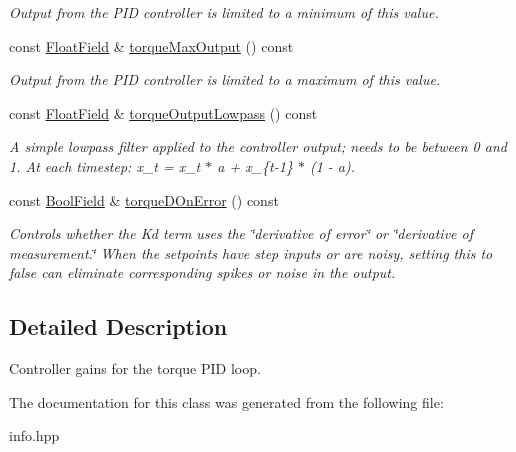 \begin{DoxyCompactItemize}
\begin{DoxyCompactList}\small\item\em Output from the P\+ID controller is limited to a minimum of this value. \end{DoxyCompactList}\item 
\mbox{\label{classhebi_1_1Info_1_1Settings_1_1Actuator_1_1TorqueGains_a9ae1d400abd91cf301a8d019b7262410}} 
const \hyperlink{classhebi_1_1Info_1_1FloatField}{Float\+Field} \& \hyperlink{classhebi_1_1Info_1_1Settings_1_1Actuator_1_1TorqueGains_a9ae1d400abd91cf301a8d019b7262410}{torque\+Max\+Output} () const
\begin{DoxyCompactList}\small\item\em Output from the P\+ID controller is limited to a maximum of this value. \end{DoxyCompactList}\item 
\mbox{\label{classhebi_1_1Info_1_1Settings_1_1Actuator_1_1TorqueGains_a909440287b2b6e5aa853eca6b102a6f8}} 
const \hyperlink{classhebi_1_1Info_1_1FloatField}{Float\+Field} \& \hyperlink{classhebi_1_1Info_1_1Settings_1_1Actuator_1_1TorqueGains_a909440287b2b6e5aa853eca6b102a6f8}{torque\+Output\+Lowpass} () const
\begin{DoxyCompactList}\small\item\em A simple lowpass filter applied to the controller output; needs to be between 0 and 1. At each timestep\+: x\+\_\+t = x\+\_\+t $\ast$ a + x\+\_\+\{t-\/1\} $\ast$ (1 -\/ a). \end{DoxyCompactList}\item 
\mbox{\label{classhebi_1_1Info_1_1Settings_1_1Actuator_1_1TorqueGains_ad94673d9668c70d54539c63ef5e95fbc}} 
const \hyperlink{classhebi_1_1Info_1_1BoolField}{Bool\+Field} \& \hyperlink{classhebi_1_1Info_1_1Settings_1_1Actuator_1_1TorqueGains_ad94673d9668c70d54539c63ef5e95fbc}{torque\+D\+On\+Error} () const
\begin{DoxyCompactList}\small\item\em Controls whether the Kd term uses the \char`\"{}derivative of error\char`\"{} or \char`\"{}derivative of measurement.\char`\"{} When the setpoints have step inputs or are noisy, setting this to {\ttfamily false} can eliminate corresponding spikes or noise in the output. \end{DoxyCompactList}\end{DoxyCompactItemize}


\subsection{Detailed Description}
Controller gains for the torque P\+ID loop. 

The documentation for this class was generated from the following file\+:\begin{DoxyCompactItemize}
\item 
info.\+hpp\end{DoxyCompactItemize}
